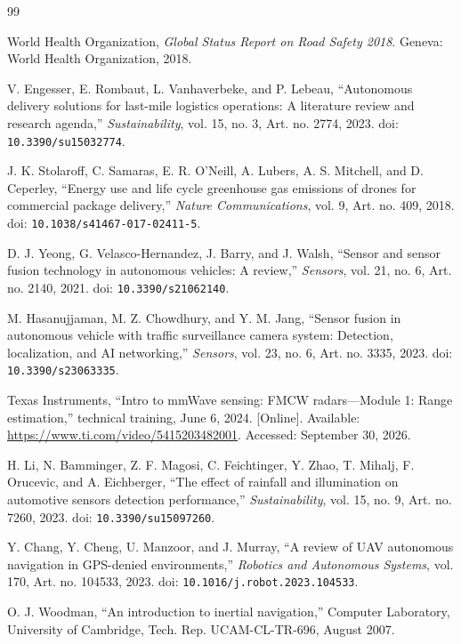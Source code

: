 \documentclass[11pt,a4paper]{article}
\begin{document}
\begin{thebibliography}{99}
\small
\raggedright
\setlength{\itemsep}{4pt}

World Health Organization, \emph{Global Status Report on Road Safety 2018}. Geneva: World Health Organization, 2018.

V. Engesser, E. Rombaut, L. Vanhaverbeke, and P. Lebeau, ``Autonomous delivery solutions for last-mile logistics operations: A literature review and research agenda,'' \emph{Sustainability}, vol. 15, no. 3, Art. no. 2774, 2023. doi: \nolinkurl{10.3390/su15032774}.

J. K. Stolaroff, C. Samaras, E. R. O'Neill, A. Lubers, A. S. Mitchell, and D. Ceperley, ``Energy use and life cycle greenhouse gas emissions of drones for commercial package delivery,'' \emph{Nature Communications}, vol. 9, Art. no. 409, 2018. doi: \nolinkurl{10.1038/s41467-017-02411-5}.

D. J. Yeong, G. Velasco-Hernandez, J. Barry, and J. Walsh, ``Sensor and sensor fusion technology in autonomous vehicles: A review,'' \emph{Sensors}, vol. 21, no. 6, Art. no. 2140, 2021. doi: \nolinkurl{10.3390/s21062140}.

M. Hasanujjaman, M. Z. Chowdhury, and Y. M. Jang, ``Sensor fusion in autonomous vehicle with traffic surveillance camera system: Detection, localization, and AI networking,'' \emph{Sensors}, vol. 23, no. 6, Art. no. 3335, 2023. doi: \nolinkurl{10.3390/s23063335}.

Texas Instruments, ``Intro to mmWave sensing: FMCW radars---Module 1: Range estimation,'' technical training, June 6, 2024. [Online]. Available: \url{https://www.ti.com/video/5415203482001}. Accessed: September 30, 2026.

H. Li, N. Bamminger, Z. F. Magosi, C. Feichtinger, Y. Zhao, T. Mihalj, F. Orucevic, and A. Eichberger, ``The effect of rainfall and illumination on automotive sensors detection performance,'' \emph{Sustainability}, vol. 15, no. 9, Art. no. 7260, 2023. doi: \nolinkurl{10.3390/su15097260}.

Y. Chang, Y. Cheng, U. Manzoor, and J. Murray, ``A review of UAV autonomous navigation in GPS-denied environments,'' \emph{Robotics and Autonomous Systems}, vol. 170, Art. no. 104533, 2023. doi: \nolinkurl{10.1016/j.robot.2023.104533}.

O. J. Woodman, ``An introduction to inertial navigation,'' Computer Laboratory, University of Cambridge, Tech. Rep. UCAM-CL-TR-696, August 2007.


\end{thebibliography}
\end{document}
